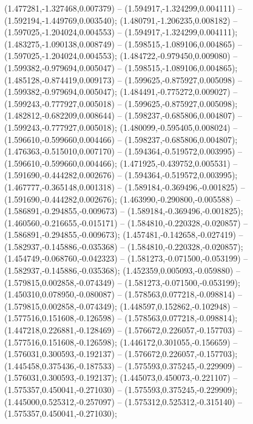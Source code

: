  (1.477281,-1.327468,0.007379) -- (1.594917,-1.324299,0.004111) -- (1.592194,-1.449769,0.003540);
 (1.480791,-1.206235,0.008182) -- (1.597025,-1.204024,0.004553) -- (1.594917,-1.324299,0.004111);
 (1.483275,-1.090138,0.008749) -- (1.598515,-1.089106,0.004865) -- (1.597025,-1.204024,0.004553);
 (1.484722,-0.979450,0.009080) -- (1.599382,-0.979694,0.005047) -- (1.598515,-1.089106,0.004865);
 (1.485128,-0.874419,0.009173) -- (1.599625,-0.875927,0.005098) -- (1.599382,-0.979694,0.005047);
 (1.484491,-0.775272,0.009027) -- (1.599243,-0.777927,0.005018) -- (1.599625,-0.875927,0.005098);
 (1.482812,-0.682209,0.008644) -- (1.598237,-0.685806,0.004807) -- (1.599243,-0.777927,0.005018);
 (1.480099,-0.595405,0.008024) -- (1.596610,-0.599660,0.004466) -- (1.598237,-0.685806,0.004807);
 (1.476363,-0.515010,0.007170) -- (1.594364,-0.519572,0.003995) -- (1.596610,-0.599660,0.004466);
 (1.471925,-0.439752,0.005531) -- (1.591690,-0.444282,0.002676) -- (1.594364,-0.519572,0.003995);
 (1.467777,-0.365148,0.001318) -- (1.589184,-0.369496,-0.001825) -- (1.591690,-0.444282,0.002676);
 (1.463990,-0.290800,-0.005588) -- (1.586891,-0.294855,-0.009673) -- (1.589184,-0.369496,-0.001825);
 (1.460560,-0.216655,-0.015171) -- (1.584810,-0.220328,-0.020857) -- (1.586891,-0.294855,-0.009673);
 (1.457481,-0.142658,-0.027419) -- (1.582937,-0.145886,-0.035368) -- (1.584810,-0.220328,-0.020857);
 (1.454749,-0.068760,-0.042323) -- (1.581273,-0.071500,-0.053199) -- (1.582937,-0.145886,-0.035368);
 (1.452359,0.005093,-0.059880) -- (1.579815,0.002858,-0.074349) -- (1.581273,-0.071500,-0.053199);
 (1.450310,0.078950,-0.080087) -- (1.578563,0.077218,-0.098814) -- (1.579815,0.002858,-0.074349);
 (1.448597,0.152862,-0.102948) -- (1.577516,0.151608,-0.126598) -- (1.578563,0.077218,-0.098814);
 (1.447218,0.226881,-0.128469) -- (1.576672,0.226057,-0.157703) -- (1.577516,0.151608,-0.126598);
 (1.446172,0.301055,-0.156659) -- (1.576031,0.300593,-0.192137) -- (1.576672,0.226057,-0.157703);
 (1.445458,0.375436,-0.187533) -- (1.575593,0.375245,-0.229909) -- (1.576031,0.300593,-0.192137);
 (1.445073,0.450073,-0.221107) -- (1.575357,0.450041,-0.271030) -- (1.575593,0.375245,-0.229909);
 (1.445000,0.525312,-0.257097) -- (1.575312,0.525312,-0.315140) -- (1.575357,0.450041,-0.271030);
